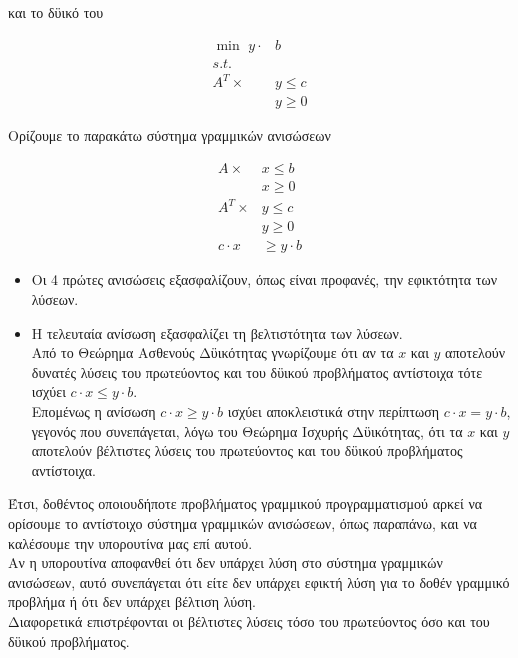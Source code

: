 \documentclass[12pt]{article}
\newcommand{\margin}{\hspace{4pt}}
\begin{document}
και το δϋικό του

\begin{align*}
    \min \margin y \cdot & b \\
    s.t. \\
    A^T \times & y \leq c \\
    & y \geq 0
\end{align*}

Ορίζουμε το παρακάτω σύστημα γραμμικών ανισώσεων

\begin{align*}
    A \times & x \leq b \\
    & x \geq 0 \\
    A^T \times & y \leq c \\
    & y \geq 0 \\
    c \cdot x & \geq y \cdot b
\end{align*}

\begin{itemize}
    \item Oι 4 πρώτες ανισώσεις εξασφαλίζουν, όπως είναι προφανές, την εφικτότητα των λύσεων.
    \item Η τελευταία ανίσωση εξασφαλίζει τη βελτιστότητα των λύσεων. \\

    Από το Θεώρημα Ασθενούς Δϋικότητας γνωρίζουμε ότι αν τα \( x \) και \( y \)
    αποτελούν δυνατές λύσεις του πρωτεύοντος και του δϋικού προβλήματος αντίστοιχα
    τότε ισχύει \( c \cdot x \leq y \cdot b \). \\

    Επομένως η ανίσωση \( c \cdot x \geq y \cdot b \) ισχύει αποκλειστικά στην περίπτωση
    \( c \cdot x = y \cdot b \), γεγονός που συνεπάγεται, λόγω
    του Θεώρημα Ισχυρής Δϋικότητας, ότι τα \( x \) και \( y \)
    αποτελούν βέλτιστες λύσεις του πρωτεύοντος και του δϋικού προβλήματος αντίστοιχα.
\end{itemize}

Έτσι, δοθέντος οποιουδήποτε προβλήματος γραμμικού προγραμματισμού αρκεί να ορίσουμε το
αντίστοιχο σύστημα γραμμικών ανισώσεων, όπως παραπάνω, και να καλέσουμε την υπορουτίνα μας επί αυτού. \\

Αν η υπορουτίνα αποφανθεί ότι δεν υπάρχει λύση στο σύστημα γραμμικών ανισώσεων,
αυτό συνεπάγεται ότι είτε δεν υπάρχει εφικτή λύση για το δοθέν γραμμικό προβλήμα
ή ότι δεν υπάρχει βέλτιση λύση. \\

Διαφορετικά επιστρέφονται οι βέλτιστες λύσεις τόσο του πρωτεύοντος όσο και του δϋικού προβλήματος. \\
\end{document}
